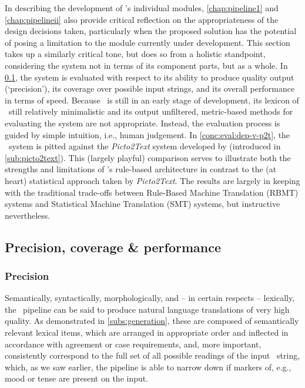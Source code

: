 In describing the development of \depicto's individual modules,
\cref{chap:pipeline1} and \cref{chap:pipelineii} also provide critical
reflection on the appropriateness of the design decisions taken, particularly
when the proposed solution has the potential of posing a limitation to the
module currently under development. This section takes up a similarly critical
tone, but does so from a holistic standpoint, considering the system not in
terms of its component parts, but as a whole. In \cref{subconc:eval:main}, the
system is evaluated with respect to its ability to produce quality output
(`precision'), its coverage over possible input strings, and its overall
performance in terms of speed. Because \depicto\ is still in an early stage of
development, its lexicon of \sclera\ still relatively minimalistic and its
output unfiltered, metric-based methods for evaluating the system are not
appropriate. Instead, the evaluation process is guided by simple intuition,
i.e., human judgement. In \cref{conc:eval:dep-v-p2t}, the \depicto\ system is
pitted against the \emph{Picto2Text} system developed by
\citet{sevens2015natural} (introduced in \cref{sub:picto2text}). This (largely
playful) comparison serves to illustrate both the strengths and limitations of
\depicto's rule-based architecture in contrast to the (at heart) statistical
approach taken by \emph{Picto2Text}. The results are largely in keeping with
the traditional trade-offs between Rule-Based Machine Translation (RBMT)
systems and Statistical Machine Translation (SMT) systems, but instructive
nevertheless.

\subsection{Precision, coverage \& performance}
\label{subconc:eval:main}

\subsubsection{Precision}

Semantically, syntactically, morphologically, and -- in certain respects --
lexically, the \depicto\ pipeline can be said to produce natural language
translations of very high quality. As demonstrated in \cref{subs:generation},
these are composed of semantically relevant lexical items, which are arranged
in appropriate order and inflected in accordance with agreement or case
requirements, and, more important, consistently correspond to the full set of
all possible readings of the input \sclera\ string, which, as we saw earlier,
the pipeline is able to narrow down if markers of, e.g., mood or tense are
present on the input.

